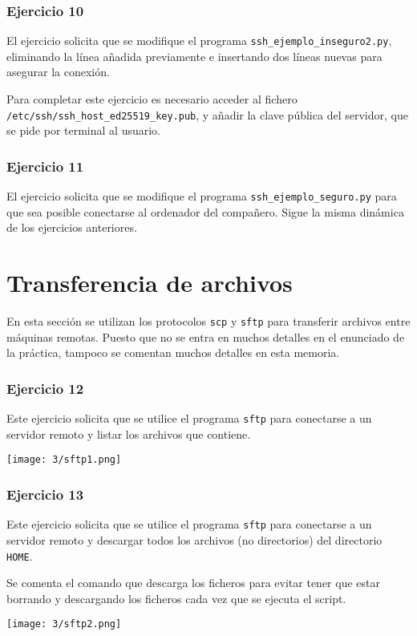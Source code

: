 \subsubsection{Ejercicio 10}
El ejercicio solicita que se modifique el programa \Verb#ssh_ejemplo_inseguro2.py#,
eliminando la línea añadida previamente e insertando dos líneas nuevas para asegurar la conexión.

Para completar este ejercicio es necesario acceder al fichero \\
\Verb#/etc/ssh/ssh_host_ed25519_key.pub#, y añadir la clave pública del servidor,
que se pide por terminal al usuario.

\subsubsection{Ejercicio 11}

El ejercicio solicita que se modifique el programa \Verb#ssh_ejemplo_seguro.py#
para que sea posible conectarse al ordenador del compañero. Sigue la misma dinámica
de los ejercicios anteriores.

\section{Transferencia de archivos}
En esta sección se utilizan los protocolos \Verb#scp# y \Verb#sftp# para transferir
archivos entre máquinas remotas. Puesto que no se entra en muchos detalles en el
enunciado de la práctica, tampoco se comentan muchos detalles en esta memoria.

\subsubsection{Ejercicio 12}
Este ejercicio solicita que se utilice el programa \Verb#sftp# para conectarse a un
servidor remoto y listar los archivos que contiene.

\begin{minipage}{\linewidth}
    \centering
    \texttt{[image: 3/sftp1.png]}
    \label{fig:3/13}
\end{minipage}

\subsubsection{Ejercicio 13}
Este ejercicio solicita que se utilice el programa \Verb#sftp# para conectarse a un
servidor remoto y descargar todos los archivos (no directorios) del directorio \Verb#HOME#.

Se comenta el comando que descarga los ficheros para evitar tener que estar borrando y
descargando los ficheros cada vez que se ejecuta el script.

\begin{minipage}{\linewidth}
    \centering
    \texttt{[image: 3/sftp2.png]}
    \label{fig:3/14}
\end{minipage}
